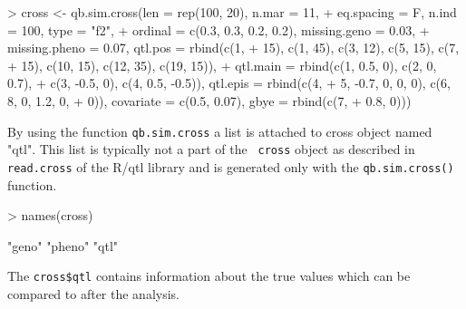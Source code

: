 \documentclass{article}
\begin{document}
\begin{Schunk}
\begin{Sinput}
> cross <- qb.sim.cross(len = rep(100, 20), n.mar = 11, 
+     eq.spacing = F, n.ind = 100, type = "f2", 
+     ordinal = c(0.3, 0.3, 0.2, 0.2), missing.geno = 0.03, 
+     missing.pheno = 0.07, qtl.pos = rbind(c(1, 
+         15), c(1, 45), c(3, 12), c(5, 15), c(7, 
+         15), c(10, 15), c(12, 35), c(19, 15)), 
+     qtl.main = rbind(c(1, 0.5, 0), c(2, 0, 0.7), 
+         c(3, -0.5, 0), c(4, 0.5, -0.5)), qtl.epis = rbind(c(4, 
+         5, -0.7, 0, 0, 0), c(6, 8, 0, 1.2, 0, 
+         0)), covariate = c(0.5, 0.07), gbye = rbind(c(7, 
+         0.8, 0)))
\end{Sinput}
\end{Schunk}

By using the function {\tt qb.sim.cross} a list is attached to cross
object named "qtl".  This list is typically not a part of the {\tt
cross} object as described in {\tt read.cross} of the R/qtl library
and is generated only with the {\tt qb.sim.cross()} function.

\begin{Schunk}
\begin{Sinput}
> names(cross)
\end{Sinput}
\begin{Soutput}
[1] "geno"  "pheno" "qtl"  
\end{Soutput}
\end{Schunk}

The {\tt cross\$qtl} contains information about the true values
which can be compared to after the analysis.

\begin{Schunk}
\end{Schunk}
\end{document}
